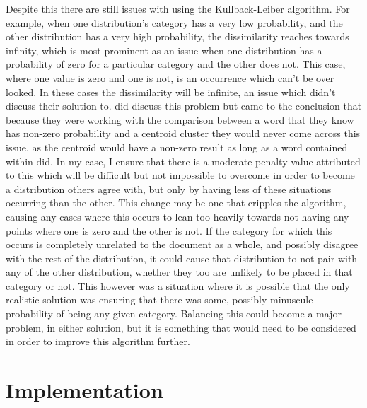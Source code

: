 \documentclass[letterpaper]{article}
\begin{document}
Despite this there are still issues with using the Kullback-Leiber algorithm. For example, when one distribution's category has a very low probability, and the other distribution has a very high probability, the dissimilarity reaches towards infinity, which is most prominent as an issue when one distribution has a probability of zero for a particular category and the other does not.
 This case, where one value is zero and one is not, is an occurrence which can't be over looked. In these cases the dissimilarity will be infinite, an issue which  \cite{baker1998distributional}  didn't discuss their solution to. \cite{pereira1993distributional} did discuss this problem but came to the conclusion that because they were working with the comparison between a word that they know has non-zero probability and a centroid cluster they would never come across this issue, as the centroid would have a non-zero result as long as a word contained within did. In my case, I ensure that there is a moderate penalty value attributed to this which will be difficult but not impossible to overcome in order to become a distribution others agree with, but only by having less of these situations occurring than the other. This change may be one that cripples the algorithm, causing any cases where this occurs to lean too heavily towards not having any points where one is zero and the other is not. 
 If the category for which this occurs is completely unrelated to the document as a whole, and possibly disagree with the rest of the distribution, it could cause that distribution to not pair with any of the other distribution, whether they too are unlikely to be placed in that category or not. This however was a situation where it is possible that the only realistic solution was ensuring that there was some, possibly minuscule probability of being any given category. Balancing this could become a major problem, in either solution, but it is something that would need to be considered in order to improve this algorithm further. 



\section{Implementation}
\end{document}
